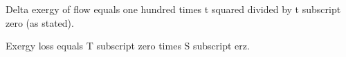 Delta exergy of flow equals one hundred times t squared divided by t subscript zero (as stated).  

Exergy loss equals T subscript zero times S subscript erz.